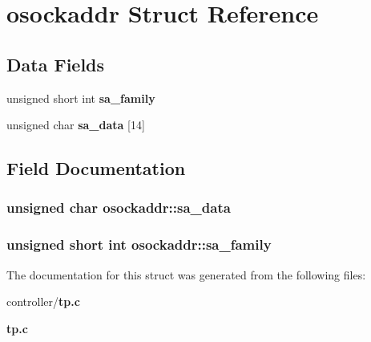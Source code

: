 \section{osockaddr Struct Reference}
\label{structosockaddr}
\subsection*{Data Fields}
\begin{DoxyCompactItemize}
\item 
unsigned short int {\bf sa\_\-family}
\item 
unsigned char {\bf sa\_\-data} [14]
\end{DoxyCompactItemize}


\subsection{Field Documentation}
\subsubsection[{sa\_\-data}]{\setlength{\rightskip}{0pt plus 5cm}unsigned char {\bf osockaddr::sa\_\-data}}\label{structosockaddr_ac61c9a27c9fbed882ee312bc7c700f25}
\subsubsection[{sa\_\-family}]{\setlength{\rightskip}{0pt plus 5cm}unsigned short int {\bf osockaddr::sa\_\-family}}\label{structosockaddr_ad86c3ceaa18fcf398564b5bd760fcd32}


The documentation for this struct was generated from the following files:\begin{DoxyCompactItemize}
\item 
controller/{\bf tp.c}\item 
{\bf tp.c}\end{DoxyCompactItemize}
